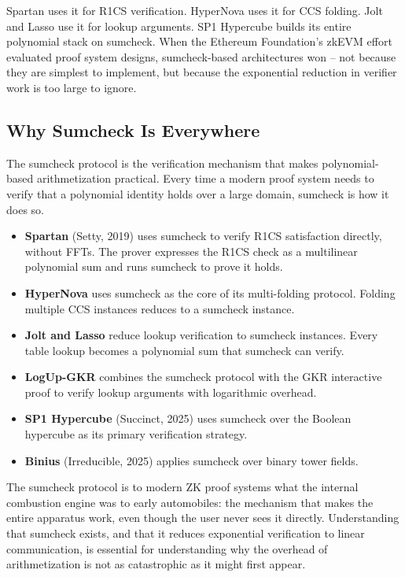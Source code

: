 \documentclass[
  11pt,
  openany]{report}
\providecommand{\tightlist}{%
  \setlength{\itemsep}{0pt}\setlength{\parskip}{0pt}}
\renewcommand{\textbf}[1]{{\bfseries\color{MidnightBold}#1}}
\begin{document}
Spartan uses it for R1CS verification. HyperNova uses it for CCS folding. Jolt
and Lasso use it for lookup arguments. SP1 Hypercube builds its entire
polynomial stack on sumcheck. When the Ethereum Foundation's zkEVM effort
evaluated proof system designs, sumcheck-based architectures won -- not because
they are simplest to implement, but because the exponential reduction in
verifier work is too large to ignore.

\subsection{Why Sumcheck Is Everywhere}\label{why-sumcheck-is-everywhere}

The sumcheck protocol is the verification mechanism that makes polynomial-based
arithmetization practical. Every time a modern proof system needs to verify that
a polynomial identity holds over a large domain, sumcheck is how it does so.

\begin{itemize}
\tightlist
\item
  \textbf{Spartan} (Setty, 2019) uses sumcheck to verify R1CS satisfaction
  directly, without FFTs. The prover expresses the R1CS check as a multilinear
  polynomial sum and runs sumcheck to prove it holds.
\item
  \textbf{HyperNova} uses sumcheck as the core of its multi-folding protocol.
  Folding multiple CCS instances reduces to a sumcheck instance.
\item
  \textbf{Jolt and Lasso} reduce lookup verification to sumcheck instances.
  Every table lookup becomes a polynomial sum that sumcheck can verify.
\item
  \textbf{LogUp-GKR} combines the sumcheck protocol with the GKR interactive
  proof to verify lookup arguments with logarithmic overhead.
\item
  \textbf{SP1 Hypercube} (Succinct, 2025) uses sumcheck over the Boolean
  hypercube as its primary verification strategy.
\item
  \textbf{Binius} (Irreducible, 2025) applies sumcheck over binary tower fields.
\end{itemize}

The sumcheck protocol is to modern ZK proof systems what the internal combustion
engine was to early automobiles: the mechanism that makes the entire apparatus
work, even though the user never sees it directly. Understanding that sumcheck
exists, and that it reduces exponential verification to linear communication, is
essential for understanding why the overhead of arithmetization is not as
catastrophic as it might first appear.
\end{document}
